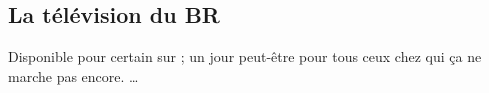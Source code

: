
\subsection{La t\'el\'evision du BR}
\label{TV}

Disponible pour certain sur  ; un jour peut-\^etre pour tous ceux chez qui ça ne marche pas encore. \dots







